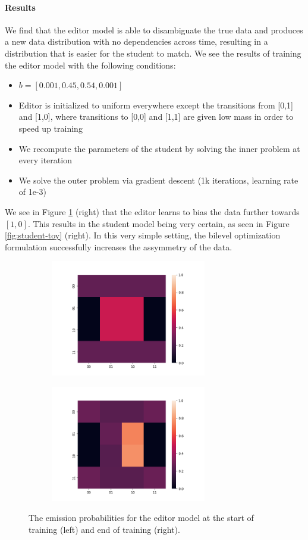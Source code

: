 \documentclass[11pt]{article}
\begin{document}
\paragraph{Results}
We find that the editor model is able to disambiguate the true data
and produces a new data distribution with no dependencies across time,
resulting in a distribution that is easier for the student to match.
We see the results of training the editor model with the following conditions:
\begin{itemize}
    \item $b = [0.001, 0.45, 0.54, 0.001]$
    \item Editor is initialized to uniform everywhere except
        the transitions from [0,1] and [1,0], where transitions to
        [0,0] and [1,1] are given low mass in order to speed up training
    \item We recompute the parameters of the student by
        solving the inner problem at every iteration
    \item We solve the outer problem via gradient descent
        (1k iterations, learning rate of 1e-3)
\end{itemize}
We see in Figure \ref{fig:editor-toy} (right) that the editor learns to
bias the data further towards $[1,0]$.
This results in the student model being very certain, as seen in Figure
\ref{fig:student-toy} (right).
In this very simple setting, the bilevel optimization formulation
successfully increases the assymmetry of the data.

\begin{figure}[h]
\centering
\begin{subfigure}[t]{0.45\textwidth}
\centering
\includegraphics[height=2in]{../plots/very_uneven_prior_editor_init.png}
\end{subfigure}
\begin{subfigure}[t]{0.45\textwidth}
\centering
\includegraphics[height=2in]{../plots/very_uneven_prior_editor_final.png}
\end{subfigure}
\caption{
\label{fig:editor-toy}
The emission probabilities for the editor model at the start of training (left)
and end of training (right).
}
\end{figure}
\end{document}
